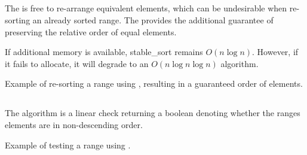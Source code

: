\subsection{\texorpdfstring{}{\texttt{std::stable\_sort}}}

The  is free to re-arrange equivalent elements, which can be undesirable when re-sorting an already sorted range. The  provides the additional guarantee of preserving the relative order of equal elements.


If additional memory is available, stable\_sort remains $O(n\log n)$. However, if it fails to allocate, it will degrade to an $O(n\log n\log n)$ algorithm.

\begin{codebox}[]{\href{https://compiler-explorer.com/z/bh7o1KG91}{\ExternalLink}}
\footnotesize Example of re-sorting a range using , resulting in a guaranteed order of elements.
\tcblower
{}
\end{codebox}

\subsection{\texorpdfstring{}{\texttt{std::is\_sorted}}}

The  algorithm is a linear check returning a boolean denoting whether the ranges elements are in non-descending order.


\begin{codebox}[]{\href{https://compiler-explorer.com/z/zqK9aohWs}{\ExternalLink}}
\footnotesize Example of testing a range using .
\tcblower
{}
\end{codebox}

\subsection{\texorpdfstring{}{\texttt{std::is\_sorted\_until}}}

